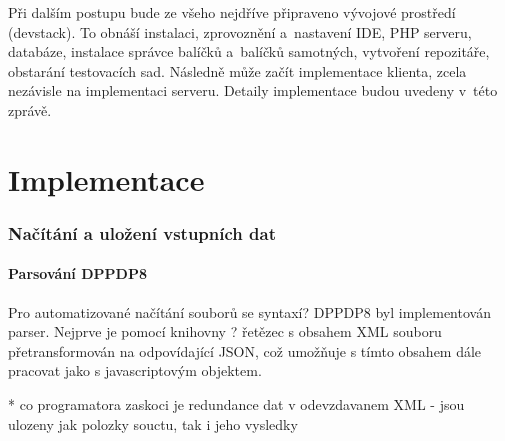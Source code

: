 Při dalším postupu bude ze všeho nejdříve připraveno vývojové prostředí (devstack). To obnáší instalaci, zprovoznění a~nastavení IDE, PHP serveru, databáze, instalace správce balíčků a~balíčků samotných, vytvoření repozitáře, obstarání testovacích sad. Následně může začít implementace klienta, zcela nezávisle na implementaci serveru. Detaily implementace budou uvedeny v~této zprávě.





















































\chapter{Implementace}


\subsection{Načítání a uložení vstupních dat}

\subsubsection{Parsování DPPDP8}
Pro automatizované načítání souborů se syntaxí? DPPDP8 byl implementován parser. Nejprve je pomocí knihovny ? řetězec s obsahem XML souboru přetransformován na odpovídající JSON, což umožňuje s tímto obsahem dále pracovat jako s javascriptovým objektem.

* co programatora zaskoci je redundance dat v odevzdavanem XML - jsou ulozeny jak polozky souctu, tak i jeho vysledky

